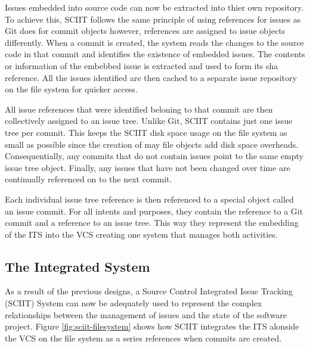 \documentclass{mproj}
\begin{document}
Issues embedded into source code can now be extracted into thier own repository. To achieve this, SCIIT follows the same principle of using references for issues as Git does for commit objects however, references are assigned to issue objects differently. When a commit is created, the system reads the changes to the source code in that commit and identifies the existence of embedded issues. The contents or information of the embebbed issue is extracted and used to form its sha reference. All the issues identified are then cached to a separate issue repository on the file system for quicker access. 

All issue references that were identified beloning to that commit are then collectively assigned to an issue tree. Unlike Git, SCIIT contains just one issue tree per commit. This keeps the SCIIT disk space usage on the file system as small as possible since the creation of may file objects add disk space overheads. Consequentially, any commits that do not contain issues point to the same empty issue tree object. Finally, any issues that have not been changed over time are continually referenced on to the next commit.

Each individual issue tree reference is then referenced to a special object called an issue commit. For all intents and purposes, they contain the reference to a Git commit and a reference to an issue tree. This way they represent the embedding of the ITS into the VCS creating one system that manages both activities. 




\subsection{The Integrated System}

As a result of the previous designs, a Source Control Integrated Issue Tracking (SCIIT) System can now be adequately used to represent the complex relationships between the management of issues and the state of the software project. Figure \ref{fig:sciit-filesystem} shows how SCIIT integrates the ITS alonside the VCS on the file system as a series references when commits are created.
\end{document}

